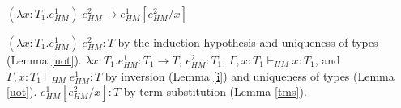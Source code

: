 \begin{case}
$(\lambda x:T_{1}.e_{HM}^{1})\;e_{HM}^{2}\rightarrow e_{HM}^{1}[e_{HM}^{2}/x]$

$(\lambda x:T_{1}.e_{HM}^{1})\;e_{HM}^{2}:T$ by the induction hypothesis and uniqueness of types (Lemma \ref{uot}).  $\lambda x:T_{1}.e_{HM}^{1}:T_{1}\rightarrow T$, $e_{HM}^{2}:T_{1}$, $\Gamma,x:T_{1}\vdash_{HM}x:T_{1}$, and $\Gamma,x:T_{1}\vdash_{HM}e_{HM}^{1}:T$ by inversion (Lemma \ref{i}) and uniqueness of types (Lemma \ref{uot}).  $e_{HM}^{1}[e_{HM}^{2}/x]:T$ by term substitution (Lemma \ref{tms}).
\end{case}